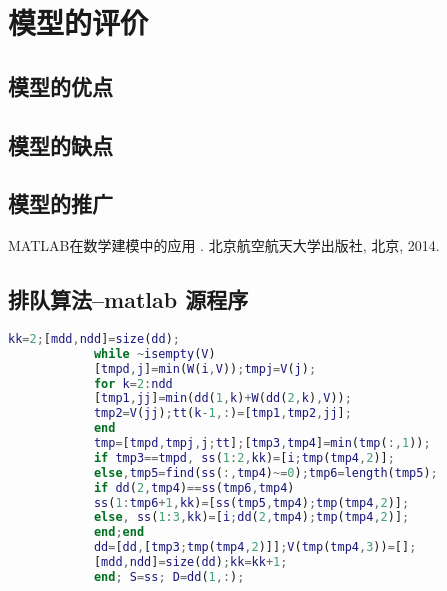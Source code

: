 \documentclass{cumcmthesis}
\begin{document}
	\section{模型的评价}
	\subsection{模型的优点}
	\subsection{模型的缺点}
	\subsection{模型的推广}
	\begin{thebibliography}{9}%
		\newblock MATLAB在数学建模中的应用 \allowbreak[J].
		\newblock 北京航空航天大学出版社, 北京, 2014. 
	\end{thebibliography}
	\begin{appendices}
		\section{排队算法--matlab 源程序}
		
		\begin{lstlisting}[language=matlab]
			kk=2;[mdd,ndd]=size(dd);
			while ~isempty(V)
			[tmpd,j]=min(W(i,V));tmpj=V(j);
			for k=2:ndd
			[tmp1,jj]=min(dd(1,k)+W(dd(2,k),V));
			tmp2=V(jj);tt(k-1,:)=[tmp1,tmp2,jj];
			end
			tmp=[tmpd,tmpj,j;tt];[tmp3,tmp4]=min(tmp(:,1));
			if tmp3==tmpd, ss(1:2,kk)=[i;tmp(tmp4,2)];
			else,tmp5=find(ss(:,tmp4)~=0);tmp6=length(tmp5);
			if dd(2,tmp4)==ss(tmp6,tmp4)
			ss(1:tmp6+1,kk)=[ss(tmp5,tmp4);tmp(tmp4,2)];
			else, ss(1:3,kk)=[i;dd(2,tmp4);tmp(tmp4,2)];
			end;end
			dd=[dd,[tmp3;tmp(tmp4,2)]];V(tmp(tmp4,3))=[];
			[mdd,ndd]=size(dd);kk=kk+1;
			end; S=ss; D=dd(1,:);
		\end{lstlisting}
	\end{appendices}
\end{document}
